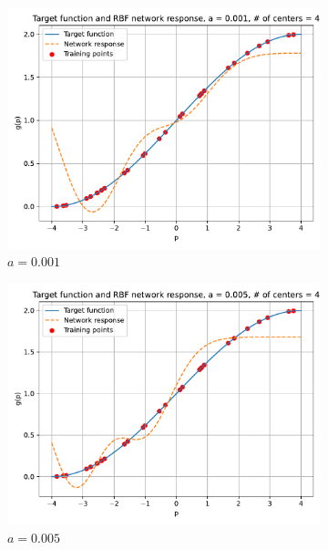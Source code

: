\begin{figure}[htbp]
	\centering
	\begin{subfigure}{0.33\linewidth}
		\centering
		\includegraphics[width=\linewidth]{../Problem 2/prob2_response_a_0.001_Cnum_4.pdf}
		\caption{$a=0.001$}
	\end{subfigure}\hfill
	\begin{subfigure}{0.33\linewidth}
		\centering
		\includegraphics[width=\linewidth]{../Problem 2/prob2_response_a_0.005_Cnum_4.pdf}
		\caption{$a=0.005$}
	\end{subfigure}\hfill
	\begin{subfigure}{0.33\linewidth}
		\centering

\end{subfigure}
\end{figure}
